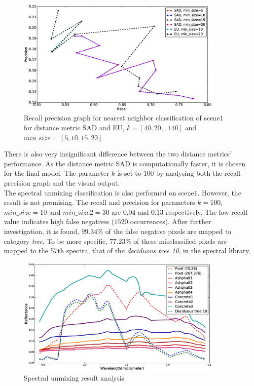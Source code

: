 \documentclass[12pt,twoside]{article}
\theoremstyle{plain}
\theoremstyle{definition}
\theoremstyle{remark}
\newcommand{\forceindent}{\leavevmode{\parindent=2em\indent}}
\begin{document}
\begin{figure}[hbtp]
\centering
\includegraphics[width=0.9\textwidth]{src/recall_prec_graph.eps}
\caption{Recall precision graph for nearest neighbor classification of scene$1$ for distance metric SAD and EU, $k=[40,20,..140]$ and $min\_size=[5,10,15,20]$ }
\label{fig:rec_prec_sad}
\end{figure}
There is also very insignificant difference between the two distance metrics' performance. As the distance metric SAD is computationally faster, it is chosen for the final model. The parameter $k$ is set to $100$ by analysing both the recall-precision graph and the visual output.\\
\forceindent The spectral unmixing classification is also performed on scene$1$. However, the result is not promising. The recall and precision for parameters $k=100$, $min\_size=10$ and $min\_size2=30$ are $0.04$ and $0.13$ respectively. The low recall value indicates high false negatives ($1520$ occurrences). After further investigation, it is found, $99.34\%$ of the false negative pixels are mapped to category \textit{tree}. To be more specific, $77.23\%$ of these misclassified pixels are mapped to the 57th spectra, that of the \textit{deciduous tree 10}, in the spectral library.
\begin{figure}[hbtp]
\centering
\includegraphics[width=0.9\textwidth]{src/unmix_misclassification_spectra.eps}
\caption{Spectral unmixing result analysis}
\label{fig:unmix_sp1}
\end{figure}
\end{document}
